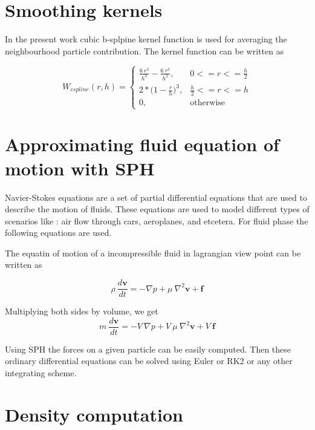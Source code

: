 \section{Smoothing kernels}
\label{sec:sk}


In the present work cubic b-splpine kernel function is used
for averaging the neighbourhood particle contribution. The kernel
function can be written as

\[
  W_{cspline}(r, h) =
  \begin{cases}
    \frac{6 \> r^3}{h^3} - \frac{6 \> r^3}{h^2}, & 0 <= r <= \frac{h}{2}\\
    2 * \big(1 - \frac{r}{h}\big)^3, & \frac{h}{2} <= r <= h\\
    0,                                          & \text{otherwise}
  \end{cases}
\]


\section{Approximating fluid equation of motion with SPH}
\label{sec:fesph}

Navier-Stokes equations are a set of partial differential equations
that are used to describe the motion of fluids. These equations are
used to model different types of scenarios like : air flow through
cars, aeroplanes, and etcetera.  For fluid phase the following
equations are used.

The equatin of motion of a incompressible fluid in lagrangian view
point can be written as

\begin{equation}
  \label{eq:momentum_eq}
  \rho\> \frac{d\textbf{v}}{dt} = -\nabla p + \mu\> \nabla^2\textbf{v} + \textbf{f}
\end{equation}

Multiplying both sides by volume, we get
\begin{equation}
  \label{eq:momentum_eq}
  m\>\frac{d\textbf{v}}{dt} = - V\> \nabla p + V\> \mu\> \nabla^2\textbf{v} + V\> \textbf{f}
\end{equation}

Using SPH the forces on a given particle can be easily computed. Then
these ordinary differential equations can be solved using Euler or RK2
or any other integrating scheme.

\section{Density computation}
\label{sec:density_comp}

